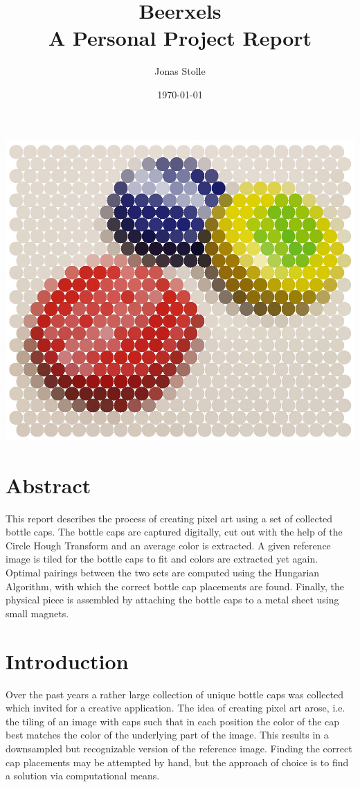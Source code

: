 \documentclass{article}
\title{Beerxels \\
	\large A Personal Project Report}
\author{Jonas Stolle}
\date{\today}
\begin{document}
\begin{titlepage}
\maketitle
\centering
	\includegraphics[width=0.8\linewidth]{caps_pics-circles.jpg}
\end{titlepage}

\section{Abstract}
This report describes the process of creating pixel art using a set of collected bottle caps. The bottle caps are captured digitally, cut out with the help of the Circle Hough Transform and an average color is extracted. A given reference image is tiled for the bottle caps to fit and colors are extracted yet again. Optimal pairings between the two sets are computed using the Hungarian Algorithm, with which the correct bottle cap placements are found. Finally, the physical piece is assembled by attaching the bottle caps to a metal sheet using small magnets. 

\section{Introduction}

Over the past years a rather large collection of unique bottle caps was collected which invited for a creative application. 
The idea of creating pixel art arose, i.e. the tiling of an image with caps such that in each position the color of the cap best matches the color of the underlying part of the image. This results in a downsampled but recognizable version of the reference image. Finding the correct cap placements may be attempted by hand, but the approach of choice is to find a solution via computational means.
\end{document}
